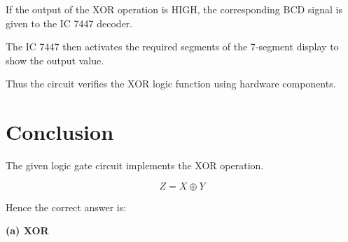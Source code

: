 \documentclass[12pt]{article}
\begin{document}
If the output of the XOR operation is HIGH, the corresponding BCD signal is given to the IC 7447 decoder.

The IC 7447 then activates the required segments of the 7-segment display to show the output value.

Thus the circuit verifies the XOR logic function using hardware components.

{\color{blue}\section*{Conclusion}}

The given logic gate circuit implements the XOR operation.

\[
Z = X \oplus Y
\]

Hence the correct answer is:

\textbf{(a) XOR}
\end{document}
